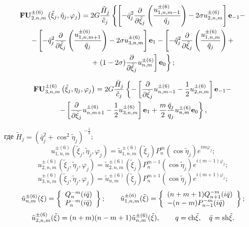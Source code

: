 \begin{russian}
\begin{multline}
{\bf{FU}}_{2,n,m}^{ \pm (6)}\left( {{{\tilde \xi }_j},{{\tilde \eta }_j},{\varphi _j}} \right) = 2G\frac{{{{\tilde H}_j}}}{{{{\tilde c}_j}}}\left\{ {\left[ { - \bar q_j^2\frac{\partial }{{\partial {{\tilde \xi }_j}}}\left( {\frac{{u_{1,n,m - 1}^{ \pm (6)}}}{{{{\bar q}_j}}}} \right) - 2\sigma u_{2,n,m}^{ \pm (6)}} \right]{{\bf{e}}_{ - 1}} - } \right.\\
- \left[ { - \bar q_j^2\frac{\partial }{{\partial {{\tilde \xi }_j}}}\left( {\frac{{u_{1,n,m + 1}^{ \pm (6)}}}{{{{\bar q}_j}}}} \right) - 2\sigma u_{3,n,m}^{ \pm (6)}} \right]{{\bf{e}}_1} - \left[ { - \tilde q_j^2\frac{\partial }{{\partial {{\tilde \xi }_j}}}\left( {\frac{{u_{1,n,m}^{ \pm (6)}}}{{{{\bar q}_j}}}} \right) + } \right.\\
\left. { + \left. {(1 - 2\sigma )\frac{\partial }{{\partial {{\tilde \xi }_j}}}u_{n,m}^{ \pm (6)}} \right]{{\bf{e}}_0}} \right\};
\label{eq:10:26o}
\end{multline}

\begin{multline}
{\bf{FU}}_{3,n,m}^{ \pm (6)}\left( {{\tilde \xi _j},{\eta _j},{\varphi _j}} \right) = 2G\frac{{{{\tilde H}_j}}}{{{{\tilde c}_j}}}\left\{ { - \left[ {\frac{\partial }{{\partial {{\tilde \xi }_j}}}u_{n,m - 1}^{ \pm (6)} - \frac{1}{2}u_{2,n,m}^{ \pm (6)}} \right]{{\bf{e}}_{ - 1}} - } \right.\\
\left. { - \left[ {\frac{\partial }{{\partial {{\tilde \xi }_j}}}u_{n,m + 1}^{ \pm (6)} - \frac{1}{2}u_{3,n,m}^{ \pm (6)}} \right]{{\bf{e}}_1} + \frac{m}{2}\frac{{{{\bar q}_j}}}{{{q_j}}}u_{n,m}^{ \pm (6)}{{\bf{e}}_0}} \right\},
\label{eq:10:27o}
\end{multline}

где ${\tilde H_j} = {\left( {\bar q_j^2 + {{\cos }^2}{{\tilde \eta }_j}} \right)^{ - \frac{1}{2}}}$;
$$
u_{1,n,m}^{ \pm (6)}\left( {{{\tilde \xi }_j},{{\tilde \eta }_j},{\varphi _j}} \right) = \tilde u_{1,n,m}^{ \pm (6)}({\tilde \xi _j})P_n^m(\cos {\tilde \eta _j}){e^{im{\varphi _j}}};
$$
$$
u_{2,n,m}^{ \pm (6)}\left( {{{\tilde \xi }_j},{{\tilde \eta }_j},{\varphi _j}} \right) = \tilde u_{2,n,m}^{ \pm (6)}({\tilde \xi _j})P_n^{m - 1}(\cos {\tilde \eta _j}){e^{i(m - 1){\varphi _j}}};
$$
$$
u_{3,n,m}^{ \pm (6)}\left( {{{\tilde \xi }_j},{{\tilde \eta }_j},{\varphi _j}} \right) = \tilde u_{n,m}^{ \pm (6)}({\tilde \xi _j})P_n^{m + 1}(\cos {\tilde \eta _j}){e^{i(m + 1){\varphi _j}}};
$$
$$
\tilde u_{n,m}^{ \pm (6)}(\xi ) = \left\{ \begin{array}{l}
Q_n^{ - m}(i\bar q)\\
P_n^{ - m}(i\bar q)
\end{array} \right\};\qquad {\kern 1pt} \tilde u_{1,n,m}^{ \pm (6)}(\tilde \xi ) = \left\{ \begin{array}{l}
(n + m + 1)Q_{n + 1}^{ - m}(i\bar q)\\
 - (n - m)P_{n - 1}^{ - m}(i\bar q)
\end{array} \right\};
$$
$$
\tilde u_{2,n,m}^{ \pm (6)}(\tilde \xi ) = (n + m)(n - m + 1)\tilde u_{n,m}^{ \pm (6)}(\tilde \xi ),\qquad {\kern 1pt} q = {\mathop{\rm ch}\nolimits} \tilde \xi ,\quad \bar q = {\mathop{\rm sh}\nolimits} \tilde\xi.
$$


\end{russian}

